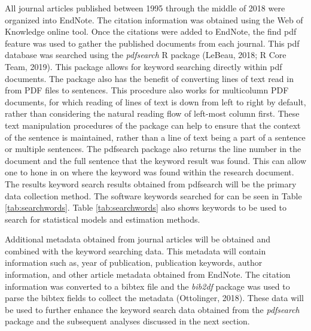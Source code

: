 \documentclass[
  english,
  ,man]{apa6}
\begin{document}
All journal articles published between 1995 through the middle of 2018 were organized into EndNote. The citation information was obtained using the Web of Knowledge online tool. Once the citations were added to EndNote, the find pdf feature was used to gather the published documents from each journal. This pdf database was searched using the \emph{pdfsearch} R package (LeBeau, 2018; R Core Team, 2019). This package allows for keyword searching directly within pdf documents. The package also has the benefit of converting lines of text read in from PDF files to sentences. This procedure also works for multicolumn PDF documents, for which reading of lines of text is down from left to right by default, rather than considering the natural reading flow of left-most column first. These text manipulation procedures of the package can help to ensure that the context of the sentence is maintained, rather than a line of text being a part of a sentence or multiple sentences. The pdfsearch package also returns the line number in the document and the full sentence that the keyword result was found. This can allow one to hone in on where the keyword was found within the research document. The results keyword search results obtained from pdfsearch will be the primary data collection method. The software keywords searched for can be seen in Table \ref{tab:searchwords}. Table \ref{tab:searchwords} also shows keywords to be used to search for statistical models and estimation methods.

Additional metadata obtained from journal articles will be obtained and combined with the keyword searching data. This metadata will contain information such as, year of publication, publication keywords, author information, and other article metadata obtained from EndNote. The citation information was converted to a bibtex file and the \emph{bib2df} package was used to parse the bibtex fields to collect the metadata (Ottolinger, 2018). These data will be used to further enhance the keyword search data obtained from the \emph{pdfsearch} package and the subsequent analyses discussed in the next section.
\end{document}
